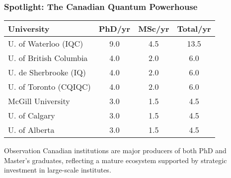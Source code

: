\documentclass[aspectratio=169]{beamer}
\newcommand{\tabletext}{\normalsize}
\begin{document}
\begin{frame}
    \frametitle{Spotlight: The Canadian Quantum Powerhouse}
    \subtitle{Canada's institute-driven model produces a significant, balanced talent pool.}
    
    \begin{table}
        \centering
        \tabletext
        \begin{tabularx}{\textwidth}{
            l
            S[table-format=1.1]
            S[table-format=1.1]
            S[table-format=1.1]
        }
            \toprule
            \textbf{University} & {\textbf{PhD/yr}} & {\textbf{MSc/yr}} & {\textbf{Total/yr}} \\
            \midrule
            U. of Waterloo (IQC) & 9.0 & 4.5 & 13.5 \\
            U. of British Columbia & 4.0 & 2.0 & 6.0 \\
            U. de Sherbrooke (IQ) & 4.0 & 2.0 & 6.0 \\
            U. of Toronto (CQIQC) & 4.0 & 2.0 & 6.0 \\
            McGill University & 3.0 & 1.5 & 4.5 \\
            U. of Calgary & 3.0 & 1.5 & 4.5 \\
            U. of Alberta & 3.0 & 1.5 & 4.5 \\
            \bottomrule
        \end{tabularx}
    \end{table}
    \begin{block}{Observation}
    Canadian institutions are major producers of both PhD and Master's graduates, reflecting a mature ecosystem supported by strategic investment in large-scale institutes.
    \end{block}
\end{frame}
\end{document}

